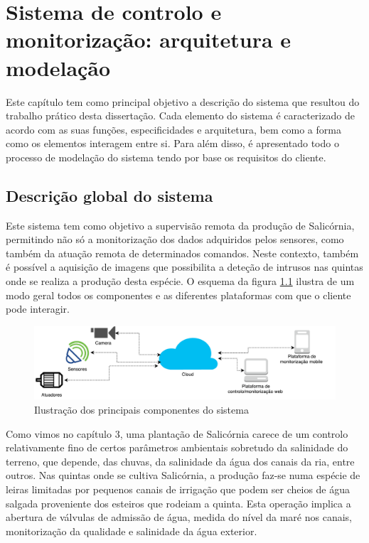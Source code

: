 

\chapter{Sistema de controlo e monitorização: arquitetura e modelação}


Este capítulo tem como principal objetivo a descrição do sistema que resultou do trabalho prático
desta dissertação. Cada elemento do sistema é caracterizado de acordo com as suas funções, especificidades e arquitetura, bem como a forma como os elementos interagem entre si. Para além disso, é apresentado todo o processo de modelação do sistema tendo por base os requisitos do cliente. 








\section{Descrição global do sistema}

Este sistema tem como objetivo a supervisão remota da produção de Salicórnia, permitindo não só a monitorização dos dados adquiridos pelos sensores, como também da atuação remota de determinados comandos. Neste contexto, também é possível a aquisição de imagens que possibilita a deteção de intrusos nas quintas onde se realiza a produção desta espécie. O esquema da figura \ref{componentesalla} ilustra de um modo geral todos os componentes e as diferentes plataformas com que o cliente pode interagir. 


\begin{figure}[!htb]
	\centering
	\includegraphics[scale=0.48]{esquemas/global_arquitetura.pdf}
	\caption{Ilustração dos principais componentes do sistema}
	\label{componentesalla}
\end{figure}






Como vimos no capítulo 3, uma plantação de  Salicórnia carece de um controlo relativamente fino de certos parâmetros ambientais sobretudo da salinidade do terreno, que depende, das chuvas, da salinidade da água dos canais da ria, entre outros. Nas quintas onde se cultiva Salicórnia, a produção faz-se numa espécie de leiras limitadas por pequenos canais de irrigação que podem ser cheios de água salgada proveniente dos esteiros que rodeiam a quinta. Esta operação implica a abertura de válvulas de admissão de água, medida do nível da maré nos canais, monitorização da qualidade e salinidade da água exterior.



